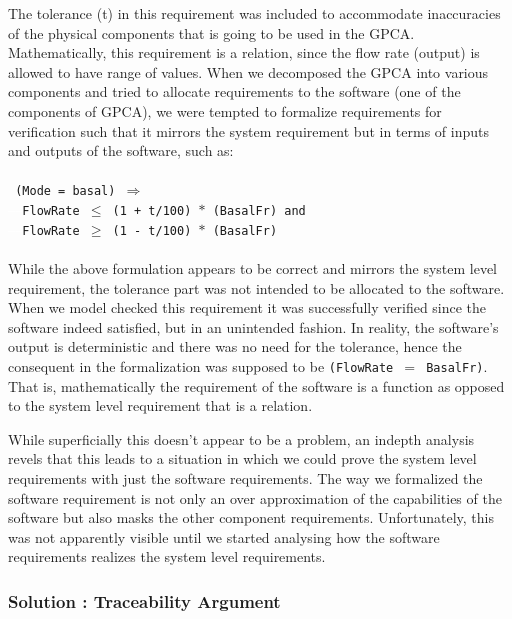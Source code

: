 The tolerance (t) in this requirement was included to accommodate inaccuracies of the physical components that is going to be used in the GPCA. Mathematically, this requirement is a relation, since the flow rate (output) is allowed to have range of values. When we decomposed the GPCA into various components and tried to allocate requirements to the software (one of the components of GPCA), we were tempted to formalize requirements for verification such that it mirrors the system requirement but in terms of inputs and outputs of the software, such as:
\\\\
\footnotesize{\texttt{
(Mode = basal) $\Rightarrow$\\
\textcolor{white}{------}FlowRate $\leq$ (1 + t/100) $\ast$ (BasalFr) and \\
\textcolor{white}{------}FlowRate $\geq$ (1 - t/100) $\ast$ (BasalFr)\\
}}
\normalsize{}\\
While the above formulation appears to be correct and mirrors the system level requirement, the tolerance part was not intended to be allocated to the software. When we model checked this requirement it was successfully verified since the software indeed satisfied, but in an unintended fashion. In reality, the software's output is deterministic and there was no need for the tolerance, hence the consequent in the formalization was supposed to be \texttt{(FlowRate $=$ BasalFr)}. That is, mathematically the requirement of the software is a function as opposed to the system level requirement that is a relation. %

While superficially this doesn't appear to be a problem, an indepth analysis revels that this leads to a situation in which we could prove the system level requirements with just the software requirements. The way we formalized the software requirement is not only an over approximation of the capabilities of the software but also masks the other component requirements. Unfortunately, this was not apparently visible until we started analysing how the software requirements realizes the system level requirements.

\subsubsection {Solution : Traceability Argument}

